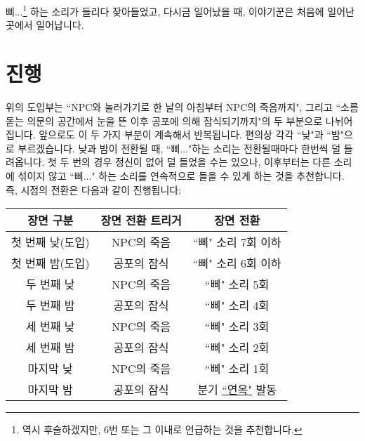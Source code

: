 \documentclass{report}
\begin{document}
		삐...\footnote{역시 후술하겠지만, 6번 또는 그 이내로 언급하는 것을 추천합니다.} 하는 소리가 들리다 잦아들었고, 다시금 일어났을 때, 이야기꾼은 처음에 일어난 곳에서 일어납니다.
		
	\section{진행}
		
		위의 도입부는 ``NPC와 놀러가기로 한 날의 아침부터 NPC의 죽음까지", 그리고 ``소름돋는 의문의 공간에서 눈을 뜬 이후 공포에 의해 잠식되기까지"의 두 부분으로 나뉘어집니다. 앞으로도 이 두 가지 부분이 계속해서 반복됩니다. 편의상 각각 ``낮"과 ``밤"으로 부르겠습니다. 낮과 밤이 전환될 때, ``삐..."하는 소리는 전환될때마다 한번씩 덜 들려옵니다. 첫 두 번의 경우 정신이 없어 덜 들었을 수는 있으나, 이후부터는 다른 소리에 섞이지 않고 ``삐..." 하는 소리를 연속적으로 들을 수 있게 하는 것을 추천합니다. 즉, 시점의 전환은 다음과 같이 진행됩니다:
		
		\begin{tightcenter}
			\begin{tabular}{!{\color{black}\vrule}c!{\color{black}\vrule}c!{\color{black}\vrule}c!{\color{black}\vrule}}
				\hline
				장면 구분        & 장면 전환 트리거 & 장면 전환                                  \\\hline\hline
				첫 번째 낮(도입) & NPC의 죽음       & ``삐" 소리 7회 이하                        \\\hline
				첫 번째 밤(도입) & 공포의 잠식      & ``삐" 소리 6회 이하                        \\\hline
				두 번째 낮       & NPC의 죽음       & ``삐" 소리 5회                             \\\hline
				두 번째 밤       & 공포의 잠식      & ``삐" 소리 4회                             \\\hline
				세 번째 낮       & NPC의 죽음       & ``삐" 소리 3회                             \\\hline
				세 번째 밤       & 공포의 잠식      & ``삐" 소리 2회                             \\\hline
				마지막 낮        & NPC의 죽음       & ``삐" 소리 1회                             \\\hline
				마지막 밤        & 공포의 잠식      & 분기 \hyperlink{dream-limbo}{``연옥"} 발동 \\\hline
			\end{tabular}
		\end{tightcenter}
		
\end{document}
